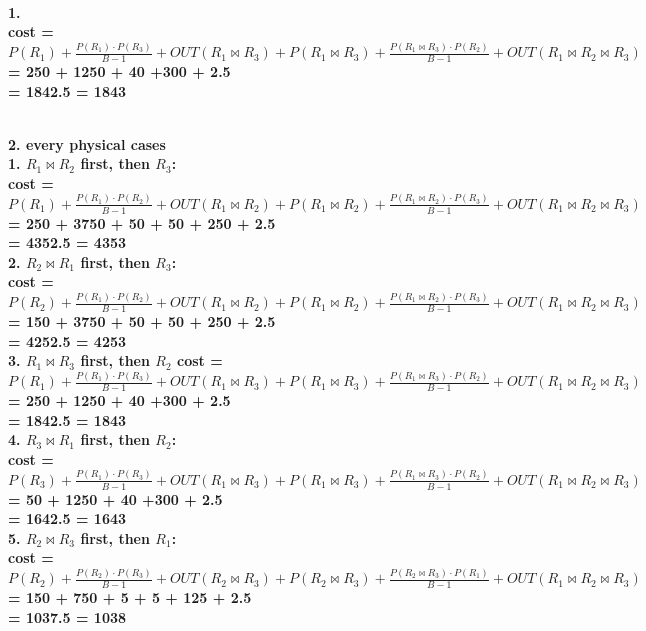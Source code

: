 \documentclass[letterpaper,11pt]{article}
\newcommand{\Paragraph}[1]{~\vspace*{-0.7\baselineskip}\\{\bf #1}}
\begin{document}
\Paragraph{1. \\
	cost = \(P(R_1) + \frac{P(R_1) \cdot P(R_3)}{B - 1} + OUT(R_1 \Join R_3) + 
	P(R_1 \Join R_3) + \frac{P(R_1 \Join R_3) \cdot P(R_2)}{B - 1} + OUT(R_1 \Join R_2 \Join R_3)\) \\
	= 250 + 1250 + 40 +300 + 2.5 \\ 
	= 1842.5 = 1843\\

}

\Paragraph{2. every physical cases \\
	1. \(R_1 \Join R_2\) first, then \(R_3\):\\
	cost = \(P(R_1) + \frac{P(R_1) \cdot P(R_2)}{B - 1} + OUT(R_1 \Join R_2) + 
	P(R_1 \Join R_2) + \frac{P(R_1 \Join R_2) \cdot P(R_3)}{B - 1} + OUT(R_1 \Join R_2 \Join R_3)\) \\
	= 250 + 3750 + 50 + 50 + 250 + 2.5 \\
	= 4352.5 = 4353\\

	2. \(R_2 \Join R_1\) first, then \(R_3\):\\
	cost = \(P(R_2) + \frac{P(R_1) \cdot P(R_2)}{B - 1} + OUT(R_1 \Join R_2) + 
	P(R_1 \Join R_2) + \frac{P(R_1 \Join R_2) \cdot P(R_3)}{B - 1} + OUT(R_1 \Join R_2 \Join R_3)\) \\
	= 150 + 3750 + 50 + 50 + 250 + 2.5 \\
	= 4252.5 = 4253\\

	3. \(R_1 \Join R_3\) first, then \(R_2\)
	cost = \(P(R_1) + \frac{P(R_1) \cdot P(R_3)}{B - 1} + OUT(R_1 \Join R_3) + 
	P(R_1 \Join R_3) + \frac{P(R_1 \Join R_3) \cdot P(R_2)}{B - 1} + OUT(R_1 \Join R_2 \Join R_3)\) \\
	= 250 + 1250 + 40 +300 + 2.5 \\ 
	= 1842.5 = 1843\\


	4. \(R_3 \Join R_1\) first, then \(R_2\): \\
	cost = \(P(R_3) + \frac{P(R_1) \cdot P(R_3)}{B - 1} + OUT(R_1 \Join R_3) + 
	P(R_1 \Join R_3) + \frac{P(R_1 \Join R_3) \cdot P(R_2)}{B - 1} + OUT(R_1 \Join R_2 \Join R_3)\) \\
	= 50 + 1250 + 40 +300 + 2.5 \\ 
	= 1642.5 = 1643\\

	5. \(R_2 \Join R_3\) first, then \(R_1\): \\
	cost = \(P(R_2) + \frac{P(R_2) \cdot P(R_3)}{B - 1} + OUT(R_2 \Join R_3) + 
	P(R_2 \Join R_3) + \frac{P(R_2 \Join R_3) \cdot P(R_1)}{B - 1} + OUT(R_1 \Join R_2 \Join R_3)\) \\
	= 150 + 750 + 5 + 5 + 125 + 2.5\\
	= 1037.5 = 1038\\

}
\end{document}
